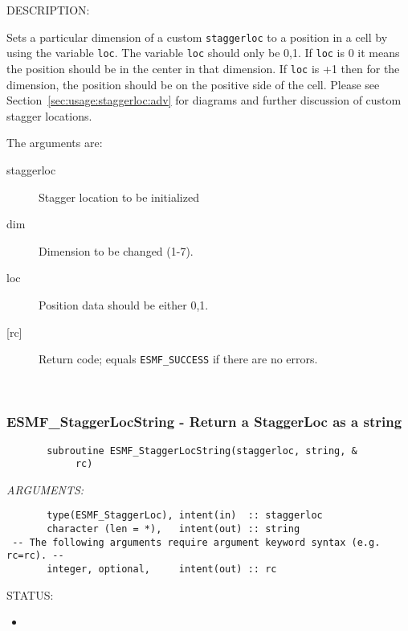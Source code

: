 {\sf DESCRIPTION:\\ }


     Sets a particular dimension of a custom {\tt staggerloc} to a position in a cell 
      by using the variable {\tt loc}. The variable {\tt loc} should only be 0,1. 
      If {\tt loc} is 0 it means the position 
      should be in the center in that dimension. If {\tt loc} is +1 then
      for the dimension, the position should be on the positive side of the cell. 
      Please see Section~\ref{sec:usage:staggerloc:adv}
      for diagrams and further discussion of custom stagger locations. 
  
       The arguments are:
       \begin{description}
       \item[staggerloc]
            Stagger location to be initialized
       \item[dim]
            Dimension to be changed (1-7).
       \item[loc]
            Position data should be either 0,1.
       \item[{[rc]}]
            Return code; equals {\tt ESMF\_SUCCESS} if there are no errors.
     \end{description}
   
 
\mbox{}\hrulefill\ 
 
\subsubsection [ESMF\_StaggerLocString] {ESMF\_StaggerLocString - Return a StaggerLoc as a string}


  
\begin{verbatim}       subroutine ESMF_StaggerLocString(staggerloc, string, &
            rc)\end{verbatim}{\em ARGUMENTS:}
\begin{verbatim}       type(ESMF_StaggerLoc), intent(in)  :: staggerloc
       character (len = *),   intent(out) :: string
 -- The following arguments require argument keyword syntax (e.g. rc=rc). --
       integer, optional,     intent(out) :: rc\end{verbatim}
{\sf STATUS:}
   \begin{itemize}
   \item{}
   \end{itemize}
  
